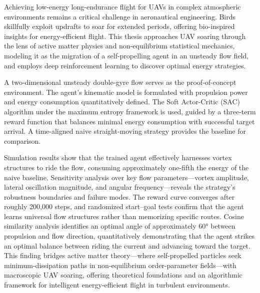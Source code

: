 \begin{engabstract}
Achieving low-energy long-endurance flight for UAVs in complex atmospheric environments remains a critical challenge in aeronautical engineering. Birds skillfully exploit updrafts to soar for extended periods, offering bio-inspired insights for energy-efficient flight. This thesis approaches UAV soaring through the lens of active matter physics and non-equilibrium statistical mechanics, modeling it as the migration of a self-propelling agent in an unsteady flow field, and employs deep reinforcement learning to discover optimal energy strategies.

A two-dimensional unsteady double-gyre flow serves as the proof-of-concept environment. The agent's kinematic model is formulated with propulsion power and energy consumption quantitatively defined. The Soft Actor-Critic (SAC) algorithm under the maximum entropy framework is used, guided by a three-term reward function that balances minimal energy consumption with successful target arrival. A time-aligned naive straight-moving strategy provides the baseline for comparison.

Simulation results show that the trained agent effectively harnesses vortex structures to ride the flow, consuming approximately one-fifth the energy of the naive baseline. Sensitivity analysis over key flow parameters---vortex amplitude, lateral oscillation magnitude, and angular frequency---reveals the strategy's robustness boundaries and failure modes. The reward curve converges after roughly 200,000 steps, and randomized start--goal tests confirm that the agent learns universal flow structures rather than memorizing specific routes. Cosine similarity analysis identifies an optimal angle of approximately 60° between propulsion and flow direction, quantitatively demonstrating that the agent strikes an optimal balance between riding the current and advancing toward the target. This finding bridges active matter theory---where self-propelled particles seek minimum-dissipation paths in non-equilibrium order-parameter fields---with macroscopic UAV soaring, offering theoretical foundations and an algorithmic framework for intelligent energy-efficient flight in turbulent environments.

\end{engabstract}


